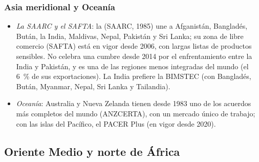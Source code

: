 \documentclass[11pt]{article}
\begin{document}
\subsubsection{Asia meridional y Oceanía}\label{sec:asia-sur}

\begin{itemize}
\item \emph{La SAARC y el SAFTA}: la  (SAARC, 1985) une a Afganistán, Bangladés, Bután, la India, Maldivas, Nepal, Pakistán y Sri Lanka; su zona de libre comercio (SAFTA) está en vigor desde 2006, con largas listas de productos sensibles. No celebra una cumbre desde 2014 por el enfrentamiento entre la India y Pakistán\nocite{MEA2026SAARC}, y es una de las regiones menos integradas del mundo (el 6~\% de sus exportaciones). La India prefiere la BIMSTEC (con Bangladés, Bután, Myanmar, Nepal, Sri Lanka y Tailandia).
\item \emph{Oceanía}: Australia y Nueva Zelanda tienen desde 1983 uno de los acuerdos más completos del mundo (ANZCERTA), con un mercado único de trabajo; con las islas del Pacífico, el PACER Plus (en vigor desde 2020).
\end{itemize}

\subsection{Oriente Medio y norte de África}\label{sec:oriente}
\end{document}
